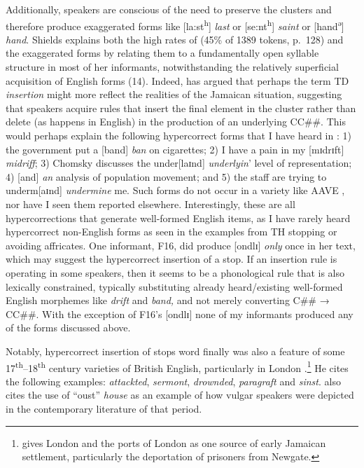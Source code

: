 Additionally, speakers are conscious of the need to preserve the clusters and therefore produce exaggerated forms like [la:st\textsuperscript{h}] \textit{last} or [se:nt\textsuperscript{h}] \textit{saint} or [hand\textsuperscript{ǝ}] \textit{hand}.  Shields explains both the high rates of  (45\% of 1389 tokens, p.~128) and the exaggerated forms by relating them to a fundamentally  open syllable structure in most of her informants, notwithstanding the relatively superficial acquisition of English forms (14).  Indeed, \citet[2]{Devonish1992} has argued that perhaps the term TD \textit{insertion} might more reflect the realities of the Jamaican situation, suggesting that speakers acquire rules that insert the final element in the cluster rather than delete (as happens in English) in the production of an underlying CC\#\#.  This would perhaps explain the following hypercorrect forms that I have heard in : 1) the government put a [band] \textit{ban} on cigarettes; 2) I have a pain in my [mɪdrɪft] \textit{midriff}; 3) Chomsky discusses the under[laɪnd] \textit{underlyin}’ level of representation; 4) [and] \textit{an} analysis of population movement; and 5) the staff are trying to underm[aɪnd] \textit{undermine} me.  Such forms do not occur in a variety like AAVE \citep[217]{Labov1972}, nor have I seen them reported elsewhere.  Interestingly, these are all hypercorrections that generate well-formed English items, as I have rarely heard hypercorrect non-English forms as seen in the examples from TH stopping or avoiding affricates.  One informant, F16, did produce [ondlɪ​] \textit{only} once in her text, which may suggest the hypercorrect insertion of a stop.  If an insertion rule is operating in some speakers, then it seems to be a phonological rule that is also lexically constrained, typically substituting already heard\slash existing well-formed English morphemes like \textit{drift} and \textit{band,} and not merely converting C\#\# → CC\#\#.  With the exception of F16's [ondlɪ​] none of my informants produced any of the forms discussed above.

Notably, hypercorrect insertion of stops word finally was also a feature of some 17\textsuperscript{th}--18\textsuperscript{th} century varieties of British English, particularly in London \citep[57--73]{Pegge1814}.\footnote{\citet[11--12]{LePage1960} gives London and the ports of London as one source of early Jamaican settlement, particularly the deportation of prisoners from Newgate.}  He cites the following examples: \textit{attackted}, \textit{sermont}, \textit{drownded}, \textit{paragraft} and \textit{sinst}.  \citet[238]{Mugglestone1995} also cites the use of “oust” \textit{house} as an example of how vulgar speakers were depicted in the contemporary literature of that period.  

